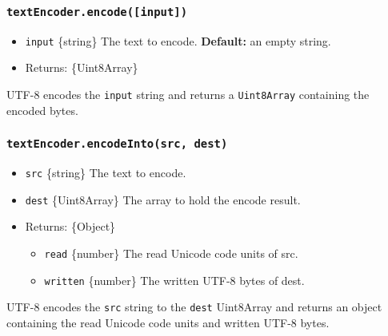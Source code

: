 \subsubsection{\texorpdfstring{\texttt{textEncoder.encode({[}input{]})}}{textEncoder.encode({[}input{]})}}\label{textencoder.encodeinput}

\begin{itemize}
\tightlist
\item
  \texttt{input} \{string\} The text to encode. \textbf{Default:} an
  empty string.
\item
  Returns: \{Uint8Array\}
\end{itemize}

UTF-8 encodes the \texttt{input} string and returns a
\texttt{Uint8Array} containing the encoded bytes.

\subsubsection{\texorpdfstring{\texttt{textEncoder.encodeInto(src,\ dest)}}{textEncoder.encodeInto(src, dest)}}\label{textencoder.encodeintosrc-dest}

\begin{itemize}
\tightlist
\item
  \texttt{src} \{string\} The text to encode.
\item
  \texttt{dest} \{Uint8Array\} The array to hold the encode result.
\item
  Returns: \{Object\}

  \begin{itemize}
  \tightlist
  \item
    \texttt{read} \{number\} The read Unicode code units of src.
  \item
    \texttt{written} \{number\} The written UTF-8 bytes of dest.
  \end{itemize}
\end{itemize}

UTF-8 encodes the \texttt{src} string to the \texttt{dest} Uint8Array
and returns an object containing the read Unicode code units and written
UTF-8 bytes.

\begin{Shaded}
\begin{Highlighting}[]
\OperatorTok{=}  \NormalTok{()}\OperatorTok{;}
\OperatorTok{=} \OperatorTok{;}
\OperatorTok{=}  \NormalTok{(}\NormalTok{)}\OperatorTok{;}
\OperatorTok{,}\OperatorTok{=}\OperatorTok{,}\OperatorTok{;}
\end{Highlighting}
\end{Shaded}

